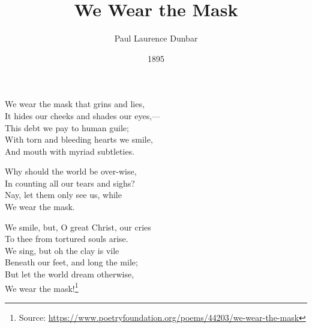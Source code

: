 \documentclass[10pt,a4paper]{article}
\newcommand{\source}[1]{\footnote{Source: \href{#1}{#1}}}
\begin{document}
\title{We Wear the Mask}
\date{1895}
\author{Paul Laurence Dunbar}
\maketitle

\setcounter{page}{1}
\linenumbers
We wear the mask that grins and lies,\\
It hides our cheeks and shades our eyes,—\\
This debt we pay to human guile;\\
With torn and bleeding hearts we smile,\\
And mouth with myriad subtleties.

Why should the world be over-wise,\\
In counting all our tears and sighs?\\
Nay, let them only see us, while\\
\hspace*{2em} We wear the mask.

We smile, but, O great Christ, our cries\\
To thee from tortured souls arise.\\
We sing, but oh the clay is vile\\
Beneath our feet, and long the mile;\\
But let the world dream otherwise,\\
\hspace*{2em} We wear the mask!\source{https://www.poetryfoundation.org/poems/44203/we-wear-the-mask}
\end{document}
